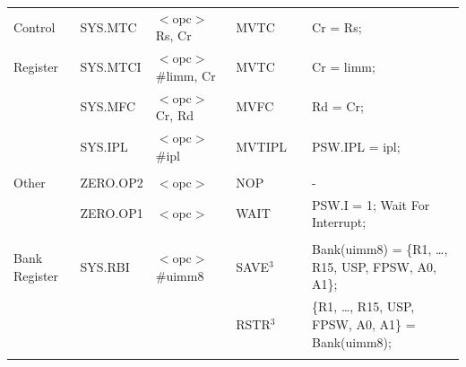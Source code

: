 \begin{table}
\begin{subtable}{\linewidth}
\begin{center}
\begin{tabular}{llllll}
Control            & SYS.MTC           & $<$opc$>$ Rs, Cr                      & MVTC              & \flags{!!!!}      & Cr = Rs;                                                                      \\
Register           & SYS.MTCI          & $<$opc$>$ \#limm, Cr                  & MVTC              & \flags{!!!!}      & Cr = limm;                                                                    \\
                   & SYS.MFC           & $<$opc$>$ Cr, Rd                      & MVFC              & \flags{----}      & Rd = Cr;                                                                      \\
                   & SYS.IPL           & $<$opc$>$ \#ipl                       & MVTIPL            & \flags{----}      & PSW.IPL = ipl;                                                                \\
                   &                   &                                       &                   &                   &                                                                               \\
Other              & ZERO.OP2          & $<$opc$>$                             & NOP               & \flags{----}      & -                                                                             \\
                   & ZERO.OP1          & $<$opc$>$                             & WAIT              & \flags{----}      & PSW.I = 1; Wait For Interrupt;                                                \\
                   &                   &                                       &                   &                   &                                                                               \\
Bank Register      & SYS.RBI           & $<$opc$>$ \#uimm8                     & SAVE$^{3}$        & \flags{----}      & Bank(uimm8) = \{R1, \ldots, R15, USP, FPSW, A0, A1\};                         \\
                   &                   &                                       & RSTR$^{3}$        & \flags{----}      & \{R1, \ldots, R15, USP, FPSW, A0, A1\} = Bank(uimm8);                         \\
                   &                   &                                       &                   &                   &                                                                               \\

\end{tabular}
\end{center}
\end{subtable}
\end{table}
